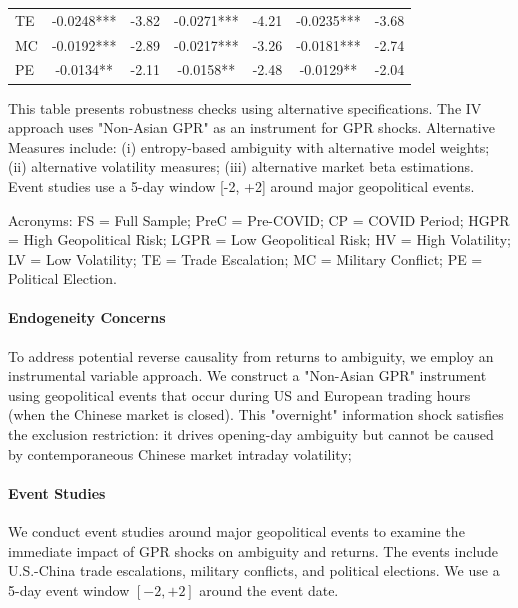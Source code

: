 \documentclass[preprint,12pt,authoryear]{elsarticle}
\begin{document}
\begin{table}[htbp]
\begin{threeparttable}
\begin{tabular*}{\textwidth}{@{\extracolsep{\fill}} lcccccc @{\extracolsep{\fill}}}
TE & -0.0248*** & -3.82 & -0.0271*** & -4.21 & -0.0235*** & -3.68 \\
MC & -0.0192*** & -2.89 & -0.0217*** & -3.26 & -0.0181*** & -2.74 \\
PE & -0.0134** & -2.11 & -0.0158** & -2.48 & -0.0129** & -2.04 \\
\bottomrule
\end{tabular*}
\begin{tablenotes}[flushleft]
\small
\item[] This table presents robustness checks using alternative specifications. The IV approach uses "Non-Asian GPR" as an instrument for GPR shocks. Alternative Measures include: (i) entropy-based ambiguity with alternative model weights; (ii) alternative volatility measures; (iii) alternative market beta estimations. Event studies use a 5-day window [-2, +2] around major geopolitical events.
\item[] Acronyms: FS = Full Sample; PreC = Pre-COVID; CP = COVID Period; HGPR = High Geopolitical Risk; LGPR = Low Geopolitical Risk; HV = High Volatility; LV = Low Volatility; TE = Trade Escalation; MC = Military Conflict; PE = Political Election.
\end{tablenotes}
\end{threeparttable}
\end{table}

\paragraph{Endogeneity Concerns} To address potential reverse causality from returns to ambiguity, we employ an instrumental variable approach. We construct a "Non-Asian GPR" instrument using geopolitical events that occur during US and European trading hours (when the Chinese market is closed). This "overnight" information shock satisfies the exclusion restriction: it drives opening-day ambiguity but cannot be caused by contemporaneous Chinese market intraday volatility;

\paragraph{Event Studies} We conduct event studies around major geopolitical events to examine the immediate impact of GPR shocks on ambiguity and returns. The events include U.S.-China trade escalations, military conflicts, and political elections. We use a 5-day event window $[-2, +2]$ around the event date.
\end{document}
